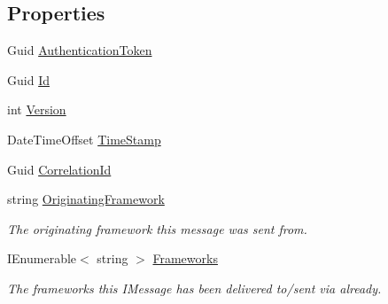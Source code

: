 \subsection*{Properties}
\begin{DoxyCompactItemize}
\item 
Guid \hyperlink{classCqrs_1_1Azure_1_1ServiceBus_1_1Tests_1_1Unit_1_1TestEvent_a3cc3380a0c4a9dce42f2b306a9b6023b}{Authentication\+Token}
\item 
Guid \hyperlink{classCqrs_1_1Azure_1_1ServiceBus_1_1Tests_1_1Unit_1_1TestEvent_a5c67228f956f56289a57d4c08e4b611e}{Id}
\item 
int \hyperlink{classCqrs_1_1Azure_1_1ServiceBus_1_1Tests_1_1Unit_1_1TestEvent_aa7a01fed424a068f05d38cdd70ad8890}{Version}
\item 
Date\+Time\+Offset \hyperlink{classCqrs_1_1Azure_1_1ServiceBus_1_1Tests_1_1Unit_1_1TestEvent_ad45c3e187502e0c8e367511900c8a808}{Time\+Stamp}
\item 
Guid \hyperlink{classCqrs_1_1Azure_1_1ServiceBus_1_1Tests_1_1Unit_1_1TestEvent_a713230eebc1d248dd7245b80553abac4}{Correlation\+Id}
\item 
string \hyperlink{classCqrs_1_1Azure_1_1ServiceBus_1_1Tests_1_1Unit_1_1TestEvent_a7945da825eb0d9a101732bfb4b3d8074}{Originating\+Framework}
\begin{DoxyCompactList}\small\item\em The originating framework this message was sent from. \end{DoxyCompactList}\item 
I\+Enumerable$<$ string $>$ \hyperlink{classCqrs_1_1Azure_1_1ServiceBus_1_1Tests_1_1Unit_1_1TestEvent_abbfe10acad422a8664ab50dc28f514f6}{Frameworks}
\begin{DoxyCompactList}\small\item\em The frameworks this I\+Message has been delivered to/sent via already. \end{DoxyCompactList}\end{DoxyCompactItemize}


